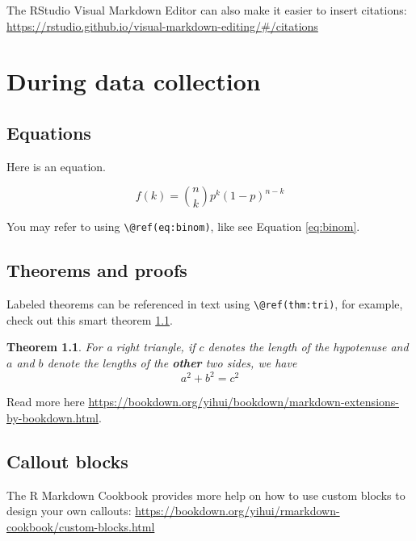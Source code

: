 \documentclass[
]{book}
\newtheorem{theorem}{Theorem}[chapter]
\theoremstyle{definition}
\theoremstyle{definition}
\theoremstyle{definition}
\theoremstyle{definition}
\theoremstyle{remark}
\begin{document}
The RStudio Visual Markdown Editor can also make it easier to insert citations: \url{https://rstudio.github.io/visual-markdown-editing/\#/citations}

\hypertarget{during-data-collection}{%
\chapter{During data collection}\label{during-data-collection}}

\hypertarget{equations}{%
\section{Equations}\label{equations}}

Here is an equation.

\begin{equation} 
  f\left(k\right) = \binom{n}{k} p^k\left(1-p\right)^{n-k}
  \label{eq:binom}
\end{equation}

You may refer to using \texttt{\textbackslash{}@ref(eq:binom)}, like see Equation \eqref{eq:binom}.

\hypertarget{theorems-and-proofs}{%
\section{Theorems and proofs}\label{theorems-and-proofs}}

Labeled theorems can be referenced in text using \texttt{\textbackslash{}@ref(thm:tri)}, for example, check out this smart theorem \ref{thm:tri}.

\begin{theorem}
\protect\hypertarget{thm:tri}{}\label{thm:tri}For a right triangle, if \(c\) denotes the \emph{length} of the hypotenuse
and \(a\) and \(b\) denote the lengths of the \textbf{other} two sides, we have
\[a^2 + b^2 = c^2\]
\end{theorem}

Read more here \url{https://bookdown.org/yihui/bookdown/markdown-extensions-by-bookdown.html}.

\hypertarget{callout-blocks}{%
\section{Callout blocks}\label{callout-blocks}}

The R Markdown Cookbook provides more help on how to use custom blocks to design your own callouts: \url{https://bookdown.org/yihui/rmarkdown-cookbook/custom-blocks.html}
\end{document}
